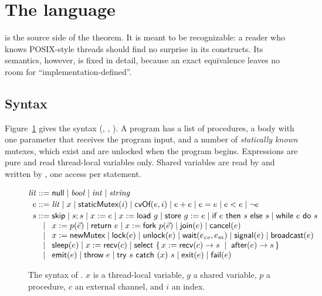\section{The language \Lang{}}
\label{sec:language}

\Lang{} is the source side of the theorem. It is meant to be recognizable:
a reader who knows POSIX-style threads should find no surprise in its
constructs. Its semantics, however, is fixed in detail, because an exact
equivalence leaves no room for ``implementation-defined''.

\subsection{Syntax}

Figure~\ref{fig:syntax} gives the syntax (, ,
). A program has a list of procedures, a  body
with one parameter that receives the program input, and a number of
\emph{statically known} mutexes, which exist and are unlocked when the
program begins. Expressions are pure and read thread-local variables only.
Shared variables are read by  and written by , one
access per statement.

\begin{figure}[t]
\small
\[
\begin{array}{@{}r@{\;}c@{\;}l@{}}
\mathit{lit} &::=& \kw{null} \mid \mathit{bool} \mid \mathit{int} \mid \mathit{string} \\[2pt]
e &::=& \mathit{lit} \mid x \mid \kw{staticMutex}(i) \mid \kw{cvOf}(e, i)
      \mid e + e \mid e = e \mid e < e \mid \lnot e \\[2pt]
s &::=& \kw{skip} \mid s ; s \mid x := e \mid x := \kw{load}\ g \mid \kw{store}\ g := e
      \mid \kw{if}\ e\ \kw{then}\ s\ \kw{else}\ s \mid \kw{while}\ e\ \kw{do}\ s \\
  &\mid& x := p(\vec{e}) \mid \kw{return}\ e
      \mid x := \kw{fork}\ p(\vec{e}) \mid \kw{join}(e) \mid \kw{cancel}(e) \\
  &\mid& x := \kw{newMutex} \mid \kw{lock}(e) \mid \kw{unlock}(e)
      \mid \kw{wait}(e_{\mathit{cv}}, e_m) \mid \kw{signal}(e) \mid \kw{broadcast}(e) \\
  &\mid& \kw{sleep}(e) \mid x := \kw{recv}(c)
      \mid \kw{select}\ \{\, x := \kw{recv}(c) \to s \;\mid\; \kw{after}(e) \to s \,\} \\
  &\mid& \kw{emit}(e) \mid \kw{throw}\ e \mid \kw{try}\ s\ \kw{catch}\ (x)\ s
      \mid \kw{exit}(e) \mid \kw{fail}(e)
\end{array}
\]
\caption{The syntax of \Lang{}. $x$ is a thread-local variable, $g$ a shared
variable, $p$ a procedure, $c$ an external channel, and $i$ an index.}
\label{fig:syntax}
\end{figure}

